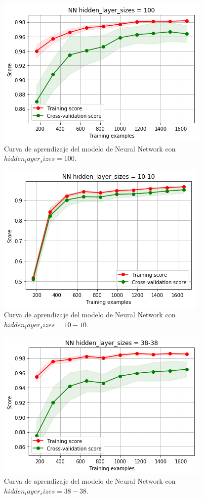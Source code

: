 \documentclass[11pt,a4paper]{article}
\begin{document}
\begin{figure}[H]
    \centering
    \includegraphics[scale=0.7]{img/lc-nn-100.png}
    \caption{Curva de aprendizaje del modelo de Neural Network con $hidden_layer_sizes=100$.}
    \label{fig:lc-nn-100}
\end{figure}

\begin{figure}[H]
    \centering
    \includegraphics[scale=0.7]{img/lc-nn-10-10.png}
    \caption{Curva de aprendizaje del modelo de Neural Network con $hidden_layer_sizes=10-10$.}
    \label{fig:lc-nn-10-10}
\end{figure}

\begin{figure}[H]
    \centering
    \includegraphics[scale=0.7]{img/lc-nn-38-38.png}
    \caption{Curva de aprendizaje del modelo de Neural Network con $hidden_layer_sizes=38-38$.}
    \label{fig:lc-nn-38-38}
\end{figure}
\end{document}
